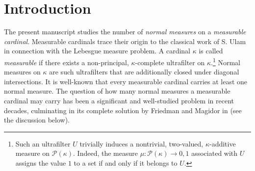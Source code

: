 \documentclass[11pt]{amsart}
\theoremstyle{definition}
\theoremstyle{remark}
\newcommand\<{{<}}
\begin{document}
\section{Introduction}

The present manuscript studies the number of \emph{normal measures} on a \emph{measurable cardinal}. Measurable cardinals trace their origin to the classical work of S. Ulam \cite{Ulam} in connection with the Lebesgue measure problem. A cardinal $\kappa$ is called \emph{measurable} if there exists a non-principal, $\kappa$-complete ultrafilter on $\kappa$.\footnote{Such an ultrafilter $U$ trivially induces a nontrivial, two-valued, $\kappa$-additive measure on $\mathcal{P}(\kappa)$. Indeed, the measure $\mu\colon \mathcal{P}(\kappa)\to {0,1}$ associated with $U$ assigns the value $1$ to a set if and only if it belongs to $U$.} Normal measures on $\kappa$ are such ultrafilters that are additionally closed under diagonal intersections. It is well-known that every measurable cardinal carries at least one normal measure. The question of how many normal measures a measurable cardinal may carry has been a significant and well-studied problem in recent decades, culminating in its complete solution by Friedman and Magidor in \cite{FriedmanMagidor} (see the discussion below).
\smallskip
\end{document}
